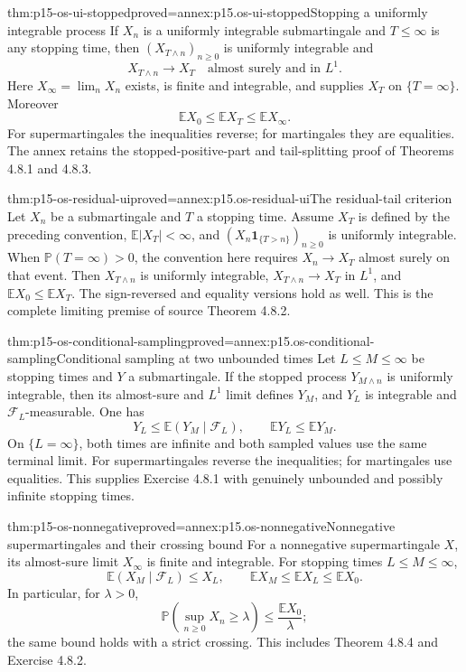 \begin{hbtheorem}{thm:p15-os-ui-stopped}{proved=annex:p15.os-ui-stopped}{Stopping a uniformly integrable process}
If \(X_n\) is a uniformly integrable submartingale and
\(T\leq\infty\) is any stopping time, then
\((X_{T\wedge n})_{n\geq0}\) is uniformly integrable and
\[
 X_{T\wedge n}\to X_T\quad\text{almost surely and in }L^1.
 \]
Here \(X_\infty=\lim_nX_n\) exists, is finite and integrable,
and supplies \(X_T\) on \(\{T=\infty\}\).
Moreover
\[
 \mathbb EX_0\leq\mathbb EX_T\leq\mathbb EX_\infty.
 \]
For supermartingales the inequalities reverse; for martingales
they are equalities. The annex retains the stopped-positive-part
and tail-splitting proof of Theorems 4.8.1 and 4.8.3.
\end{hbtheorem}

\begin{hbtheorem}{thm:p15-os-residual-ui}{proved=annex:p15.os-residual-ui}{The residual-tail criterion}
Let \(X_n\) be a submartingale and \(T\) a stopping time.
Assume \(X_T\) is defined by the preceding convention,
\(\mathbb E|X_T|<\infty\), and
\((X_n\mathbf1_{\{T>n\}})_{n\geq0}\) is uniformly integrable.
When \(\mathbb P(T=\infty)>0\), the convention here requires
\(X_n\to X_T\) almost surely on that event.
Then \(X_{T\wedge n}\) is uniformly integrable,
\(X_{T\wedge n}\to X_T\) in \(L^1\), and
\(\mathbb EX_0\leq\mathbb EX_T\).
The sign-reversed and equality versions hold as well.
This is the complete limiting premise of source Theorem 4.8.2.
\end{hbtheorem}

\begin{hbtheorem}{thm:p15-os-conditional-sampling}{proved=annex:p15.os-conditional-sampling}{Conditional sampling at two unbounded times}
Let \(L\leq M\leq\infty\) be stopping times and \(Y\) a
submartingale. If the stopped process \(Y_{M\wedge n}\) is
uniformly integrable, then its almost-sure and \(L^1\) limit
defines \(Y_M\), and \(Y_L\) is integrable and
\(\mathcal F_L\)-measurable. One has
\[
 Y_L\leq\mathbb E(Y_M\mid\mathcal F_L),\qquad
 \mathbb EY_L\leq\mathbb EY_M.
 \]
On \(\{L=\infty\}\), both times are infinite and both sampled
values use the same terminal limit.
For supermartingales reverse the inequalities; for martingales
use equalities. This supplies Exercise 4.8.1 with genuinely
unbounded and possibly infinite stopping times.
\end{hbtheorem}

\begin{hbtheorem}{thm:p15-os-nonnegative}{proved=annex:p15.os-nonnegative}{Nonnegative supermartingales and their crossing bound}
For a nonnegative supermartingale \(X\), its almost-sure limit
\(X_\infty\) is finite and integrable. For stopping times
\(L\leq M\leq\infty\),
\[
 \mathbb E(X_M\mid\mathcal F_L)\leq X_L,\qquad
 \mathbb EX_M\leq\mathbb EX_L\leq\mathbb EX_0.
 \]
In particular, for \(\lambda>0\),
\[
 \mathbb P\left(\sup_{n\geq0}X_n\geq\lambda\right)
                         \leq\frac{\mathbb EX_0}{\lambda};
 \]
the same bound holds with a strict crossing.
This includes Theorem 4.8.4 and Exercise 4.8.2.
\end{hbtheorem}

